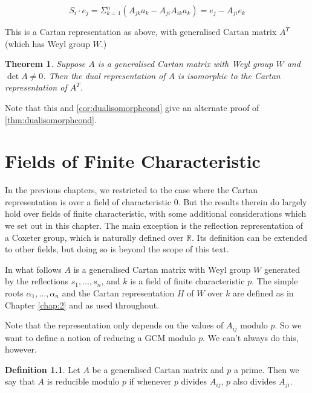 \documentclass[11pt,a4paper]{report}
\newtheorem{theorem}{Theorem}[chapter]
\theoremstyle{definition}
\newtheorem{definition}[theorem]{Definition}
\begin{document}
\begin{equation*}S_i \cdot e_j = \Sigma_{k=1}^n (A_{jk} a_k - A_{ji} A_{ik} a_k) = e_j - A_{ji} e_k\end{equation*} 

This is a Cartan representation as above, with generalised Cartan matrix $A^T$ (which has Weyl group $W$.) 

\begin{theorem}\label{thm:dualtransposeisomorph} Suppose $A$ is a generalised Cartan matrix with Weyl group $W$ and $\det A \neq 0$. Then the dual representation of $A$ is isomorphic to the Cartan representation of $A^T$.\end{theorem}

Note that this and \ref{cor:dualisomorphcond} give an alternate proof of \ref{thm:dualisomorphcond}. 



\chapter{Fields of Finite Characteristic}

\label{chap:7}
In the previous chapters, we restricted to the case where the Cartan representation is over a field of characteristic $0$. But the results therein do largely hold over fields of finite characteristic, with some additional considerations which we set out in this chapter. The main exception is the reflection representation of a Coxeter group, which is naturally defined over $\mathbb{R}$. Its definition can be extended to other fields, but doing so is beyond the scope of this text. 

In what follows $A$ is a generalised Cartan matrix with Weyl group $W$ generated by the reflections $s_1, \ldots, s_n$, and $k$ is a field of finite characteristic $p$. The simple roots $\alpha_1,\ldots, \alpha_n$ and the Cartan representation $H$ of $W$ over $k$ are defined as in Chapter \ref{chap:2} and as used throughout.

Note that the representation only depends on the values of $A_{ij}$ modulo $p$. So we want to define a notion of reducing a GCM modulo $p$. We can't always do this, however.

\begin{definition}Let $A$ be a generalised Cartan matrix and $p$ a prime. Then we say that $A$ is reducible modulo $p$ if whenever $p$ divides $A_{ij}$, $p$ also divides $A_{ji}$.\end{definition}
\end{document}
